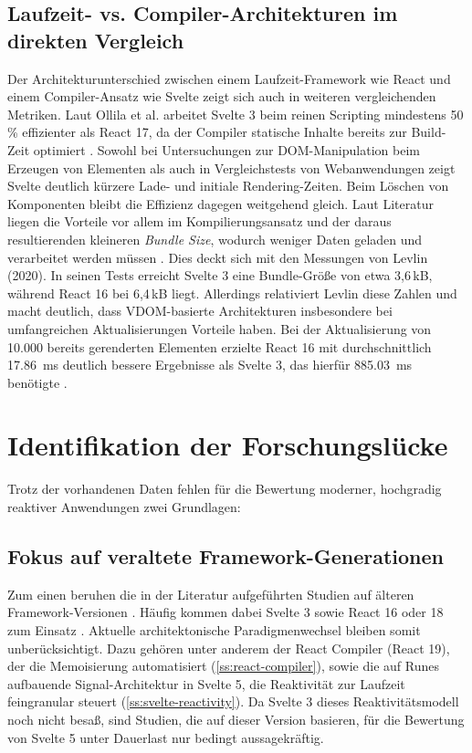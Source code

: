 \subsection{Laufzeit- vs. Compiler-Architekturen im direkten Vergleich}
Der Architekturunterschied zwischen einem Laufzeit-Framework wie React und einem Compiler-Ansatz wie Svelte zeigt sich auch in weiteren vergleichenden Metriken. Laut Ollila et al. arbeitet Svelte 3 beim reinen Scripting mindestens 50\,\% effizienter als React 17, da der Compiler statische Inhalte bereits zur Build-Zeit optimiert \cite{ollila-rendering_performance-2022}. Sowohl bei Untersuchungen zur DOM-Manipulation beim Erzeugen von Elementen als auch in Vergleichstests von Webanwendungen zeigt Svelte deutlich kürzere Lade- und initiale Rendering-Zeiten. Beim Löschen von Komponenten bleibt die Effizienz dagegen weitgehend gleich. Laut Literatur liegen die Vorteile vor allem im Kompilierungsansatz und der daraus resultierenden kleineren \textit{Bundle Size}, wodurch weniger Daten geladen und verarbeitet werden müssen \cite{performance-svelte-angular-2021, perbandingan-svelte-react-2025}. Dies deckt sich mit den Messungen von Levlin (2020). In seinen Tests erreicht Svelte 3 eine Bundle-Größe von etwa 3,6\,kB, während React 16 bei 6,4\,kB liegt. Allerdings relativiert Levlin diese Zahlen und macht deutlich, dass VDOM-basierte Architekturen insbesondere bei umfangreichen Aktualisierungen Vorteile haben. Bei der Aktualisierung von 10.000 bereits gerenderten Elementen erzielte React 16 mit durchschnittlich \qty{17,86}{ms} deutlich bessere Ergebnisse als Svelte 3, das hierfür \qty{885,03}{ms} benötigte \cite{levlin-dom-benchmark-2020}.

\section{Identifikation der Forschungslücke}
\label{s:research-gap}

Trotz der vorhandenen Daten fehlen für die Bewertung moderner, hochgradig reaktiver Anwendungen zwei Grundlagen:

\subsection{Fokus auf veraltete Framework-Generationen}
Zum einen beruhen die in der Literatur aufgeführten Studien auf älteren Framework-Versionen \cite{levlin-dom-benchmark-2020, putra-performance-2025, ollila-rendering_performance-2022}. Häufig kommen dabei Svelte 3 sowie React 16 oder 18 zum Einsatz \cite{levlin-dom-benchmark-2020, putra-performance-2025}. Aktuelle architektonische Paradigmenwechsel bleiben somit unberücksichtigt. Dazu gehören unter anderem der React Compiler (React 19), der die Memoisierung automatisiert (\cref{ss:react-compiler}), sowie die auf Runes aufbauende Signal-Architektur in Svelte 5, die Reaktivität zur Laufzeit feingranular steuert (\cref{ss:svelte-reactivity}). Da Svelte 3 dieses Reaktivitätsmodell noch nicht besaß, sind Studien, die auf dieser Version basieren, für die Bewertung von Svelte 5 unter Dauerlast nur bedingt aussagekräftig.


